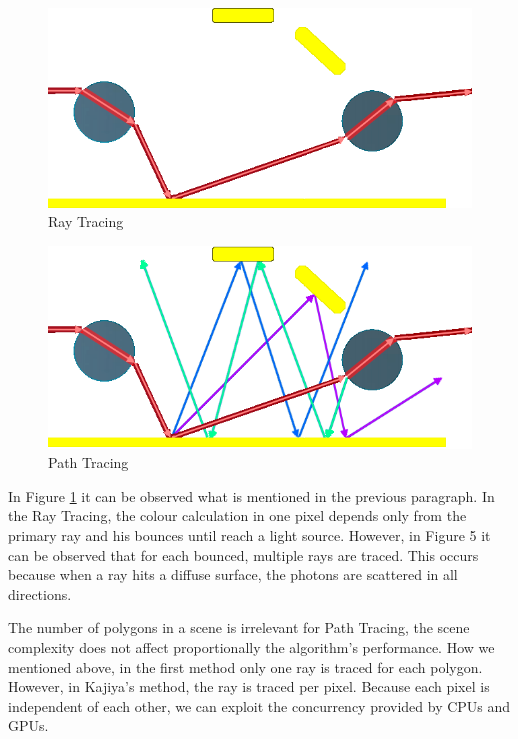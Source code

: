 \documentclass[titlepage,12pt]{article}
\begin{document}
\begin{figure}[!ht]
	\centering
	\includegraphics[scale=0.45]{media/lightPathRT.png}
	\caption{Ray Tracing}
	\label{RT_traced}
\end{figure}

\begin{figure}[!ht]
	\centering
	\includegraphics[scale=0.45]{media/lightPathPT.png}
	\caption{Path Tracing}
	\label{PT_traced}
\end{figure}

In Figure \ref{RT_traced} it can be observed what is mentioned in the previous paragraph. In the Ray Tracing, the colour calculation in one pixel depends only from the primary ray and his bounces until reach a light source. However, in Figure 5 it can be observed that for each bounced, multiple rays are traced. This occurs because when a ray hits a diffuse surface, the photons are scattered in all directions. 

The number of polygons in a scene is irrelevant for Path Tracing, the scene complexity does not affect proportionally the algorithm's performance. How we mentioned above, in the first method only one ray is traced for each polygon. However, in Kajiya's method, the ray is traced per pixel. Because each pixel is independent of each other, we can exploit the concurrency provided by CPUs and GPUs.
\end{document}
